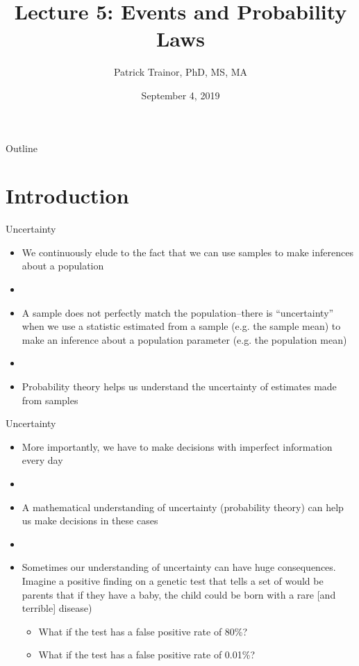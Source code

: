 \documentclass[xcolor=dvipsnames]{beamer}
\title[Lecture 5]{Lecture 5: Events and Probability Laws}
\author[Patrick Trainor]{Patrick Trainor, PhD, MS, MA}
\institute[NMSU]{New Mexico State University}
\date{September 4, 2019}
\begin{document}
\begin{frame}
\maketitle
\end{frame}

\begin{frame}{Outline}
\tableofcontents[hideallsubsections]
\end{frame}

\section{Introduction}
\begin{frame}{Uncertainty}
	\begin{itemize}
		\item We continuously elude to the fact that we can use samples to make inferences about a population
		\item[]
		\item A sample does not perfectly match the population--there is ``uncertainty'' when we use a statistic estimated from a sample (e.g. the sample mean) to make an inference about a population parameter (e.g. the population mean)
		\item[]
		\item Probability theory helps us understand the uncertainty of estimates made from samples
	\end{itemize}
\end{frame}

\begin{frame}{Uncertainty}
\begin{itemize}
	\item More importantly, we have to make decisions with imperfect information every day
	\item[]
	\item A mathematical understanding of uncertainty (probability theory) can help us make decisions in these cases
	\item[]
	\item Sometimes our understanding of uncertainty can have huge consequences. Imagine a positive finding on a genetic test that tells a set of would be parents that if they have a baby, the child could be born with a rare [and terrible] disease)
	\begin{itemize}
		\item What if the test has a false positive rate of 80\%?
		\item What if the test has a false positive rate of 0.01\%?
	\end{itemize}
\end{itemize}
\end{frame}
\end{document}
